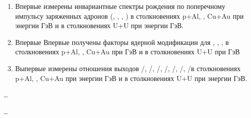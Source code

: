 {\novelty}
\begin{enumerate}[beginpenalty=10000] %
	\item Впервые измерены инвариантные спектры рождения по поперечному импульсу заряженных адронов (\pipm, \Kpm, \prot, \aprot) в столкновениях  p+Al, \heau, Cu+Au при энергии  ГэВ и в столкновениях U+U при энергии  ГэВ.
	\item Впервые 	Впервые получены факторы ядерной модификации для \pipm, \Kpm, \prot, \aprot в столкновениях  p+Al, \heau, Cu+Au при  ГэВ и в столкновениях U+U при  ГэВ
	\item 	Выпервые измерены отношения выходов \pim/\pip, \Km/\Kp, \prot/\aprot, \prot/\pip, \aprot/\pim, \Kp/\pip, \Km/\pim  в столкновениях  p+Al, \heau, Cu+Au при энергии  ГэВ и в столкновениях U+U при энергии  ГэВ.
\end{enumerate}

{\influence} \ldots

{\methods} \ldots


